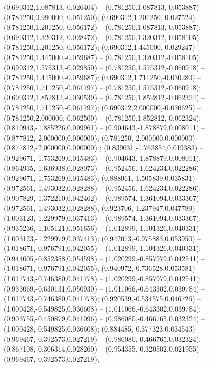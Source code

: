  (0.690312,1.087813,-0.026404) -- (0.781250,1.087813,-0.053887) -- (0.781250,0.980000,-0.051250);
 (0.690312,1.201250,-0.027524) -- (0.781250,1.201250,-0.056172) -- (0.781250,1.087813,-0.053887);
 (0.690312,1.320312,-0.028472) -- (0.781250,1.320312,-0.058105) -- (0.781250,1.201250,-0.056172);
 (0.690312,1.445000,-0.029247) -- (0.781250,1.445000,-0.059687) -- (0.781250,1.320312,-0.058105);
 (0.690312,1.575313,-0.029850) -- (0.781250,1.575312,-0.060918) -- (0.781250,1.445000,-0.059687);
 (0.690312,1.711250,-0.030280) -- (0.781250,1.711250,-0.061797) -- (0.781250,1.575312,-0.060918);
 (0.690312,1.852812,-0.030539) -- (0.781250,1.852812,-0.062324) -- (0.781250,1.711250,-0.061797);
 (0.690312,2.000000,-0.030625) -- (0.781250,2.000000,-0.062500) -- (0.781250,1.852812,-0.062324);
 (0.810943,-1.885226,0.009961) -- (0.904643,-1.878879,0.008011) -- (0.877812,-2.000000,0.000000);
 (0.781250,-2.000000,0.000000) -- (0.877812,-2.000000,0.000000) ;
 (0.839031,-1.763854,0.019383) -- (0.929671,-1.753269,0.015483) -- (0.904643,-1.878879,0.008011);
 (0.864935,-1.636938,0.028073) -- (0.952456,-1.624234,0.022286) -- (0.929671,-1.753269,0.015483);
 (0.888061,-1.505839,0.035831) -- (0.972561,-1.493032,0.028288) -- (0.952456,-1.624234,0.022286);
 (0.907829,-1.372210,0.042462) -- (0.989574,-1.361094,0.033367) -- (0.972561,-1.493032,0.028288);
 (0.923706,-1.237947,0.047789) -- (1.003123,-1.229979,0.037413) -- (0.989574,-1.361094,0.033367);
 (0.935236,-1.105121,0.051656) -- (1.012899,-1.101326,0.040331) -- (1.003123,-1.229979,0.037413);
 (0.942073,-0.975883,0.053950) -- (1.018671,-0.976791,0.042055) -- (1.012899,-1.101326,0.040331);
 (0.944005,-0.852358,0.054598) -- (1.020299,-0.857979,0.042541) -- (1.018671,-0.976791,0.042055);
 (0.940972,-0.736528,0.053581) -- (1.017743,-0.746380,0.041778) -- (1.020299,-0.857979,0.042541);
 (0.933069,-0.630131,0.050930) -- (1.011066,-0.643302,0.039784) -- (1.017743,-0.746380,0.041778);
 (0.920539,-0.534575,0.046726) -- (1.000428,-0.549825,0.036608) -- (1.011066,-0.643302,0.039784);
 (0.903755,-0.450879,0.041096) -- (0.986080,-0.466765,0.032324) -- (1.000428,-0.549825,0.036608);
 (0.884485,-0.377323,0.034543) -- (0.969467,-0.392573,0.027219) -- (0.986080,-0.466765,0.032324);
 (0.867108,-0.306314,0.028260) -- (0.954355,-0.320502,0.021955) -- (0.969467,-0.392573,0.027219);
